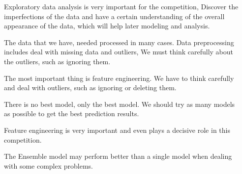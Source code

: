 \documentclass{tikzposter} %
\begin{document}
\begin{columns}
{		}
		
		{
			\begin{description}
				\item Exploratory data analysis is 
				very important for the competition,
				Discover the imperfections of the 
				data and have a certain understanding 
				of the overall appearance of the data, 
				which will help later modeling and analysis. 
				\vspace{.5cm}
				\item The data that we have,
				needed processed in many cases.
				Data preprocessing includes 
				deal with missing data and outliers, 
				We must think carefully about the outliers, 
				such as ignoring them.
				\vspace{.5cm}
				\item The most important thing is
				feature engineering.
				We have to think carefully and 
				deal with outliers, such as ignoring 
				or deleting them.
				\vspace{.5cm}
				\item There is no best model, 
				only the best model. We should 
				try as many models as possible to 
				get the best prediction results. 
				\vspace{.5cm}
				\item Feature engineering is very 
				important and even plays a decisive 
				role in this competition.
				\vspace{.5cm}
				\item The Ensemble model may perform better 
				than a single model when dealing 
				with some complex problems.	
				\vspace{.5cm}
			\end{description}
		}
		
		
		
		
	\end{columns}
	
	
\end{document}
